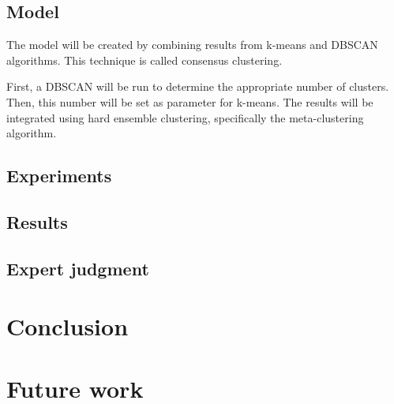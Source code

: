 \documentclass{article}
\begin{document}
\subsection{Model}
The model will be created by combining results from k-means and DBSCAN algorithms. This technique is called consensus clustering.

First, a DBSCAN will be run to determine the appropriate number of clusters. Then, this number will be set as parameter for k-means. The results will be integrated using hard ensemble clustering, specifically the meta-clustering algorithm. 

\subsection{Experiments}

\subsection{Results}

\subsection{Expert judgment}


\newpage
\section{Conclusion}


\newpage
\section{Future work}

\newpage
{}

\end{document}
